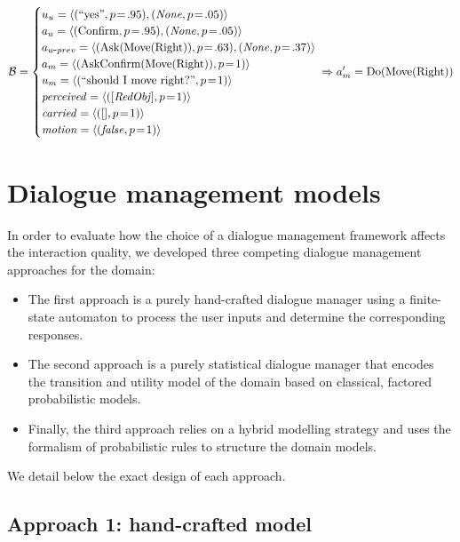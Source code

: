 \begin{align*}
\mathcal{B} = \begin{cases} u_u = \langle (``\text{yes}", p\!=\!.95), (\mathit{None}, p\!=\!.05) \rangle \\
a_u = \langle (\mathrm{Confirm}, p\!=\!.95), (\mathit{None}, p\!=\!.05) \rangle \\
a_{u\mbox{-}prev} = \langle (\mathrm{Ask(Move(Right))}, p\!=\!.63), (\mathit{None}, p\!=\!.37) \rangle \\
a_m = \langle (\mathrm{AskConfirm(Move(Right))}, p\!=\!1) \rangle \\
u_m = \langle (``\text{should I move right?}", p\!=\!1) \rangle \\
\mathit{perceived} = \langle ([\mathit{RedObj}], p\!=\!1) \rangle \\
\mathit{carried} = \langle ([], p\!=\!1) \rangle \\
\mathit{motion} = \langle (\mathit{false}, p\!=\!1) \rangle \\
 \end{cases} \!\!\!\!\!\Rightarrow a_m' = \mathrm{Do(Move(Right))}
\end{align*}


\section{Dialogue management models}
\label{sec:dialmodels_exp3}

In order to evaluate how the choice of a dialogue management framework affects the interaction quality, we developed three competing dialogue management approaches for the domain:
\begin{itemize} 
\item The first approach is a purely hand-crafted dialogue manager using a finite-state automaton to process the user inputs and determine the corresponding responses. 
\item The second approach is a purely statistical dialogue manager that encodes the transition and utility model of the domain based on classical, factored probabilistic models.
\item Finally, the third approach relies on a hybrid modelling strategy and uses the formalism of probabilistic rules to structure the domain models.
\end{itemize}

We detail below the exact design of each approach.

\subsection{Approach 1: hand-crafted model}
\label{sec:approach1}


